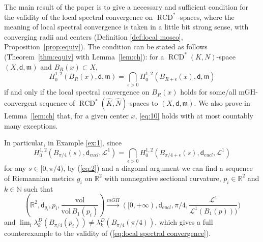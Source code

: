 \documentclass[a4paper,11pt,reqno]{article}
\numberwithin{equation}{section}
\theoremstyle{plain}
\theoremstyle{definition}
\theoremstyle{remark}
\newcommand{\dist}{\mathsf{d}}
\newcommand{\meas}{\mathfrak{m}}
\DeclareMathOperator{\RCD}{RCD}
\begin{document}
The main result of the paper is to give a necessary and sufficient condition for the validity of the local spectral convergence on $\RCD^*$-spaces, where the meaning of local spectral convergence is taken in a little bit strong sense, with converging radii and centers 
(Definition \ref{def:local mosco}, Proposition~\ref{prop:equiv}). The condition can be stated as follows 
(Theorem~\ref{thm:equiv} with Lemma~\ref{lem:ch}):  for a $\RCD^*(K, N)$-space $(X, \dist, \meas)$ and $B_R(x)\subset X$,
\begin{equation}\label{eq:10}
H^{1, 2}_0(B_R(x), \dist, \meas )=\bigcap_{\epsilon>0}H^{1, 2}_0(B_{R+\epsilon}(x), \dist, \meas )
\end{equation}
if and only if the local spectral convergence on $B_R(x)$ holds for some/all mGH-convergent sequence of $\RCD^*(\hat{K}, \hat{N})$-spaces to $(X, \dist, \meas)$. We also prove in Lemma~\ref{lem:ch} that, for a given center $x$, \eqref{eq:10} holds with at most countably many exceptions.


In particular, in Example \ref{ex:1}, since 
$$
H^{1, 2}_0(B_{\pi/4}(s), \dist_{eucl}, \mathcal{L}^1) = \bigcap_{\epsilon>0}H^{1, 2}_0(B_{\pi/4+\epsilon}(s), \dist_{eucl}, \mathcal{L}^1)
$$
for any $s \in [0, \pi/4)$, by (\ref{eq:2}) and a diagonal argument we can find
a sequence of Riemannian metrics $g_i$ on $\mathbb{R}^2$ with nonnegative sectional curvature, $p_i \in \mathbb{R}^2$ and $k \in \mathbb{N}$ such that $$(\mathbb{R}^2, \dist_{g_i}, p_i, \frac{\mathrm{vol}}{\mathrm{vol}\, B_1(p_i)}) \stackrel{mGH}{\to} ([0, +\infty),  \dist_{eucl}, \pi/4, \frac{\mathcal{L}^1}{\mathcal{L}^1(B_1(p)))})$$
and $\lim_i\lambda_k^D(B_{\pi/4}(p_i)) \neq \lambda_k^D(B_{\pi/4}(\pi/4))$, which gives a 
full counterexample to the validity of (\ref{eq:local spectral convergence}).
\end{document}
